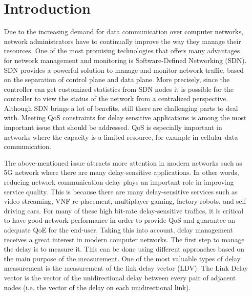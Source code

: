 \documentclass[10pt, journal, letterpaper]{IEEEtran}
\begin{document}
\section{Introduction}
Due to the increasing demand for data communication over computer networks, network administrators have to continually improve the way they manage their resources. One of the most promising technologies that offers many advantages for network management and monitoring is Software-Defined Networking (SDN). SDN provides a powerful solution to manage and monitor network traffic, based on the separation of control plane and data plane. More precisely, since the controller can get customized statistics from SDN nodes it is possible for the controller to view the status of the network from a centralized perspective. %
Although SDN brings a lot of benefits, still there are challenging parts to deal with. Meeting QoS constraints for delay sensitive applications is among the most important issue that should be addressed. QoS is especially important in networks where the capacity is a limited resource, for example in cellular data communication.

The above-mentioned issue attracts more attention in modern networks such as 5G network where there are many delay-sensitive applications. In other words, reducing network communication delay plays an important role in improving service quality. This is because there are many delay-sensitive services such as video streaming, VNF re-placement, multiplayer gaming, factory robots, and self-driving cars. For many of these high bit-rate delay-sensitive traffics, it is critical to have good network performance in order to provide QoS and guarantee an adequate QoE for the end-user. Taking this into account, delay management receives a great interest in modern computer networks. The first step to manage the delay is to measure it. This can be done using different approaches based on the main purpose of the measurement. One of the most valuable types of delay measurement is the measurement of the link delay vector (LDV). The Link Delay vector is the vector of the unidirectional delay between every pair of adjacent nodes (i.e. the vector of the delay on each unidirectional link). 
\end{document}
